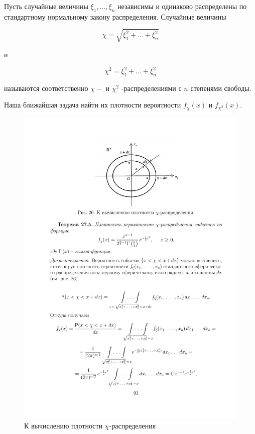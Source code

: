\begin{definition}
Пусть случайные величины $\xi_1 , \ldots , \xi_n$ независимы и одинаково распределены по стандартному нормальному закону распределения. Случайные величины

$$\chi = \sqrt{\xi_1^2 +\ldots + \xi_n^2 }$$

и

$$\chi^2 = \xi_1^2 + \ldots + \xi_n^2$$

называются соответственно $\chi-$ и $\chi^2$ -распределениями с $n$ степенями свободы.

Наша ближайшая задача найти их плотности вероятности $f_{\chi} (x)$ и $f_{\chi^2} (x)$.
\end{definition}

\begin{figure}[H]
	\centering
	\includegraphics[]{pic/pic26}
	\caption{К вычислению плотности $\chi$-распределения}
	\label{fig26}
\end{figure}

